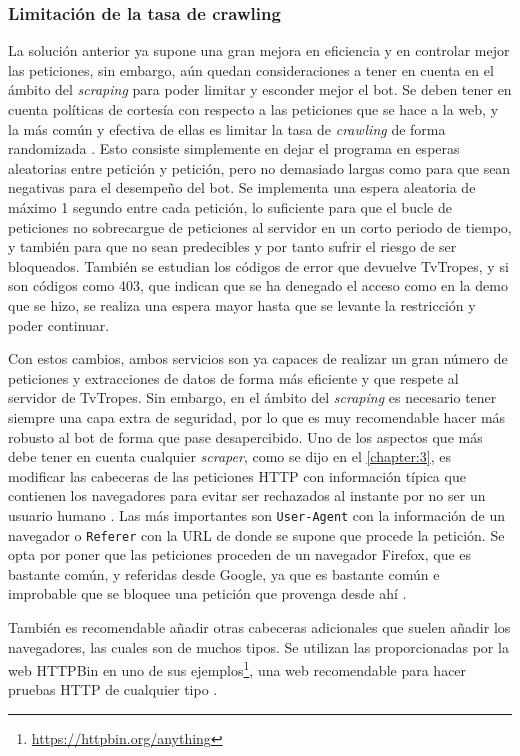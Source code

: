 \subsubsection{Limitación de la tasa de crawling}
La solución anterior ya supone una gran mejora en eficiencia y en controlar
mejor las peticiones, sin embargo, aún quedan consideraciones a tener en cuenta
en el ámbito del \textit{scraping} para poder limitar y esconder mejor el bot.
Se deben tener en cuenta políticas de cortesía con respecto a las peticiones que
se hace a la web, y la más común y efectiva de ellas es limitar la tasa de
\textit{crawling} de forma randomizada \cite{apress2018scraping}. Esto consiste
simplemente en dejar el programa en esperas aleatorias entre petición y
petición, pero no demasiado largas como para que sean negativas para el
desempeño del bot. Se implementa una espera aleatoria de máximo 1 segundo entre
cada petición, lo suficiente para que el bucle de peticiones no sobrecargue de
peticiones al servidor en un corto periodo de tiempo, y también para que no sean
predecibles y por tanto sufrir el riesgo de ser bloqueados. También se estudian
los códigos de error que devuelve TvTropes, y si son códigos como 403, que
indican que se ha denegado el acceso como en la demo que se hizo, se realiza una
espera mayor hasta que se levante la restricción y poder continuar.

Con estos cambios, ambos servicios son ya capaces de realizar un gran número de
peticiones y extracciones de datos de forma más eficiente y que respete al
servidor de TvTropes. Sin embargo, en el ámbito del \textit{scraping} es
necesario tener siempre una capa extra de seguridad, por lo que es muy
recomendable hacer más robusto al bot de forma que pase desapercibido. Uno de
los aspectos que más debe tener en cuenta cualquier \textit{scraper}, como se
dijo en el \autoref{chapter:3}, es modificar las cabeceras de las peticiones
HTTP con información típica que contienen los navegadores para evitar ser
rechazados al instante por no ser un usuario humano \cite{apress2018scraping}.
Las más importantes son \texttt{User-Agent} con la información de un navegador o
\texttt{Referer} con la URL de donde se supone que procede la petición. Se opta
por poner que las peticiones proceden de un navegador Firefox, que es bastante
común, y referidas desde Google, ya que es bastante común e improbable que se
bloquee una petición que provenga desde ahí \cite{bettenbuk_10_2019}.

También es recomendable añadir otras cabeceras adicionales que suelen añadir los
navegadores, las cuales son de muchos tipos. Se utilizan las proporcionadas por
la web HTTPBin en uno de sus
ejemplos\footnote{\url{https://httpbin.org/anything}}, una web recomendable para
hacer pruebas HTTP de cualquier tipo \cite{bettenbuk_10_2019}.

